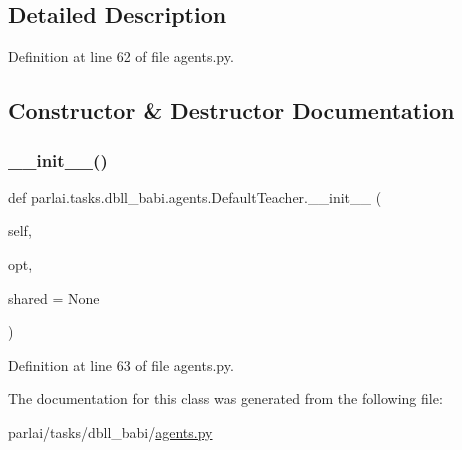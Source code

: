 \subsection{Detailed Description}


Definition at line 62 of file agents.\+py.



\subsection{Constructor \& Destructor Documentation}
\mbox{\label{classparlai_1_1tasks_1_1dbll__babi_1_1agents_1_1DefaultTeacher_ab7d8ee5ef045a12162f79ec74898bca0}} 
\subsubsection{\texorpdfstring{\+\_\+\+\_\+init\+\_\+\+\_\+()}{\_\_init\_\_()}}
{\footnotesize\ttfamily def parlai.\+tasks.\+dbll\+\_\+babi.\+agents.\+Default\+Teacher.\+\_\+\+\_\+init\+\_\+\+\_\+ (\begin{DoxyParamCaption}\item[{}]{self,  }\item[{}]{opt,  }\item[{}]{shared = {\ttfamily None} }\end{DoxyParamCaption})}



Definition at line 63 of file agents.\+py.



The documentation for this class was generated from the following file\+:\begin{DoxyCompactItemize}
\item 
parlai/tasks/dbll\+\_\+babi/\hyperlink{parlai_2tasks_2dbll__babi_2agents_8py}{agents.\+py}\end{DoxyCompactItemize}

